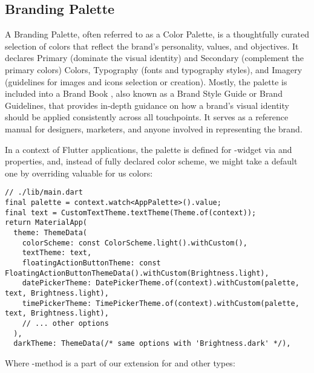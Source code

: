 
\subsection{Branding Palette}

A Branding Palette, often referred to as a Color Palette, is a thoughtfully curated selection of colors that reflect the 
brand's personality, values, and objectives. It declares Primary (dominate the visual identity) and Secondary 
(complement the primary colors) Colors, Typography (fonts and typography styles), and Imagery (guidelines for images 
and icons selection or creation). Mostly, the palette is included into a Brand Book \cite{Geyr16}, also known as a 
Brand Style Guide or Brand Guidelines, that provides in-depth guidance on how a brand's visual identity should be 
applied consistently across all touchpoints. It serves as a reference manual for designers, marketers, and anyone 
involved in representing the brand.

In a context of Flutter applications, the palette is defined for -widget via  and 
 properties, and, instead of fully declared color scheme, we might take a default one
by overriding valuable for us colors: 

\begin{lstlisting}
// ./lib/main.dart
final palette = context.watch<AppPalette>().value;
final text = CustomTextTheme.textTheme(Theme.of(context));
return MaterialApp(
  theme: ThemeData(
    colorScheme: const ColorScheme.light().withCustom(),
    textTheme: text,
    floatingActionButtonTheme: const FloatingActionButtonThemeData().withCustom(Brightness.light),
    datePickerTheme: DatePickerTheme.of(context).withCustom(palette, text, Brightness.light),
    timePickerTheme: TimePickerTheme.of(context).withCustom(palette, text, Brightness.light),
    // ... other options
  ),
  darkTheme: ThemeData(/* same options with 'Brightness.dark' */),
\end{lstlisting}

\noindent Where -method is a part of our extension for  and other types:


